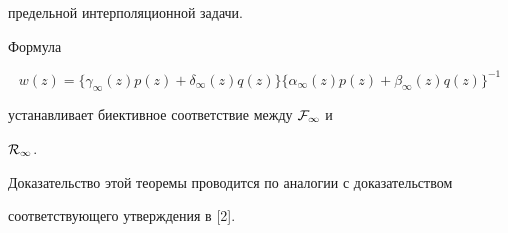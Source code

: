 предельной интерполяционной задачи.





\begin{thm}


Формула


\begin{equation}


w(z)=\{\gamma _{\infty } (z)p(z)+\delta _{\infty } (z)q(z) \}


\{ \alpha _{\infty } (z)p(z)+ \beta _{\infty } (z)q(z) \}^{-1}


\end{equation}


устанавливает биективное соответствие между ${\cal F}_{\infty }$ и


${\cal R}_{\infty }$.


\end{thm}





Доказательство этой теоремы проводится по аналогии с доказательством


соответствующего утверждения в [2].






